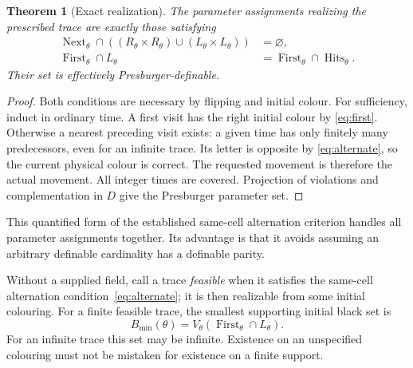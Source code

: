 \documentclass[11pt]{article}
\newtheorem{theorem}{Theorem}[section]
\theoremstyle{remark}\newtheorem{remark}[theorem]{Remark}
\begin{document}
\begin{theorem}[Exact realization]\label{thm:semantics}
The parameter assignments realizing the prescribed trace are exactly those
satisfying
\begin{align}
\operatorname{Next}_\theta\cap
 ((R_\theta\times R_\theta)\cup(L_\theta\times L_\theta))&=\varnothing,
                                                        \label{eq:alternate}\\
\operatorname{First}_\theta\cap L_\theta
 &=\operatorname{First}_\theta\cap\operatorname{Hits}_\theta.
                                                        \label{eq:first}
\end{align}
Their set is effectively Presburger-definable.
\end{theorem}
\begin{proof}
Both conditions are necessary by flipping and initial colour. For sufficiency,
induct in ordinary time. A first visit has the right initial colour by
\eqref{eq:first}. Otherwise a nearest preceding visit exists: a given time has
only finitely many predecessors, even for an infinite trace. Its letter is
opposite by \eqref{eq:alternate}, so the current physical colour is correct.
The requested movement is therefore the actual movement. All integer times
are covered. Projection of violations and complementation in $D$ give the
Presburger parameter set.
\end{proof}

This quantified form of the established same-cell alternation criterion
\cite{gajardo} handles all parameter assignments together. Its advantage is that it avoids assuming an arbitrary definable
cardinality has a definable parity.

Without a supplied field, call a trace \emph{feasible} when it satisfies
the same-cell alternation condition~\eqref{eq:alternate}; it is then
realizable from some initial colouring. For a finite feasible trace, the smallest supporting
initial black set is
\begin{equation}\label{eq:root}
 B_{\min}(\theta)=V_\theta(\operatorname{First}_\theta\cap L_\theta).
\end{equation}
For an infinite trace this set may be infinite. Existence on an unspecified
colouring must not be mistaken for existence on a finite support.
\end{document}

